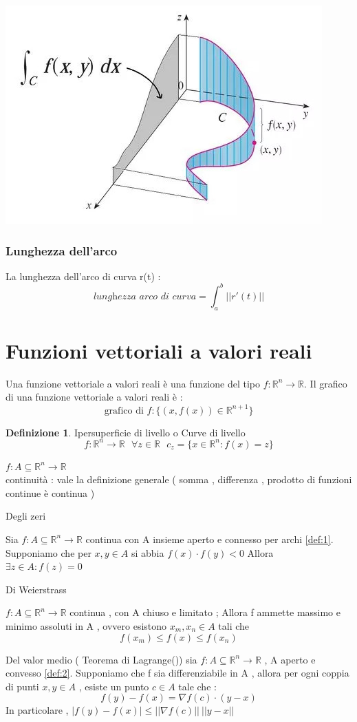 \documentclass{article}
\theoremstyle{definition}
\newtheorem*{definizione}{Definizione}
\newcommand{\R}{\mathbb{R}}
\newcommand{\Rn}{\R^n}
\newcommand{\fn}{f: A\subseteq \Rn \rightarrow \R}
\begin{document}
	\begin{center}
		\includegraphics[scale=0.40]{immagini/line.jpg}
		
	\end{center}
	\subsubsection{Lunghezza dell'arco}
	La lunghezza dell'arco di curva r(t) :
	$$\textit{lunghezza arco di curva}=\int_a^b||r'(t)||$$
	\section{Funzioni vettoriali a valori reali}
	Una funzione vettoriale a valori reali è una funzione del tipo $f: \Rn \rightarrow \R$. Il grafico di una funzione vettoriale a valori reali è : $$\text{grafico di }f:\{(x,f(x))\in \R^{n+1}\}$$
	\begin{definizione}
		Ipersuperficie di livello o Curve di livello \\
		$$f: \Rn \rightarrow \R \ \ \ \forall z \in \R \ \ \ c_z=\{x\in \Rn : f(x)=z\}$$ 
	\end{definizione}
	$\fn$ \\
	continuità : vale la definizione generale ( somma , differenza , prodotto di funzioni continue è continua ) 
	
	\begin{teo}{Degli zeri}{}
		
		Sia $\fn$ continua con A insieme aperto e connesso per archi \ref{def:1}. \\
		Supponiamo che per $x,y \in A $ si abbia $f(x) \cdot f(y)<0$ Allora $ \exists z \in A : f(z)=0$
	\end{teo}
	\begin{teo}{Di Weierstrass}{}
		
		$\fn$ continua , con A chiuso e limitato ; Allora f ammette massimo e minimo assoluti in A , ovvero esistono $x_m,x_n \in A$ tali che $$f(x_m) \leq f(x) \leq f(x_n)$$
	\end{teo}
	\begin{teo}{Del valor medio ( Teorema di Lagrange())}
		sia $\fn$ , A aperto e convesso \ref{def:2}. Supponiamo che f sia differenziabile in A , allora per ogni coppia di punti $x,y \in A$ , esiste un punto $c \in A $ tale che : 
		$$f(y)-f(x)=\nabla f(c) \cdot (y-x)$$
		In particolare , $|f(y)-f(x)|\leq ||\nabla f(c)|| \ ||y-x||$ 
		
	\end{teo}
\end{document}
